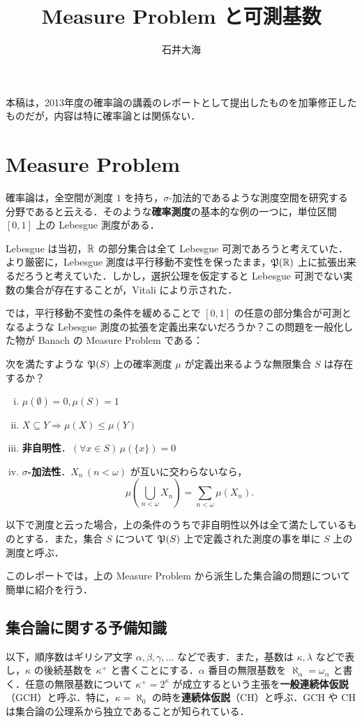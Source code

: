 \documentclass[a4j]{jsarticle}
\title{Measure Problem と可測基数}
\author{石井大海}
\begin{document}
\maketitle

本稿は，2013年度の確率論の講義のレポートとして提出したものを加筆修正したものだが，内容は特に確率論とは関係ない．

\section{Measure Problem}
確率論は，全空間が測度 $1$ を持ち，$\sigma$-加法的であるような測度空間を研究する分野であると云える．そのような{\bfseries 確率測度}の基本的な例の一つに，単位区間 $[0, 1]$ 上の Lebesgue 測度がある．

Lebesgue は当初，$\mathbb{R}$ の部分集合は全て Lebesgue 可測であろうと考えていた．より厳密に，Lebesgue 測度は平行移動不変性を保ったまま，$\mathfrak{P}(\mathbb{R})$ 上に拡張出来るだろうと考えていた．しかし，選択公理を仮定すると Lebesgue 可測でない実数の集合が存在することが，Vitali により示された．

では，平行移動不変性の条件を緩めることで $[0, 1]$ の任意の部分集合が可測となるような Lebesgue 測度の拡張を定義出来ないだろうか？この問題を一般化した物が Banach の Measure Problem である：

\begin{problem}
 次を満たすような $\mathfrak{P}(S)$ 上の確率測度 $\mu$ が定義出来るような無限集合 $S$ は存在するか？
 \begin{enumerate}[(i)]
  \item $\mu(\emptyset) = 0, \mu(S) = 1$
  \item $X \subseteq Y \Rightarrow \mu(X) \leq \mu(Y)$
  \item {\bfseries 非自明性}．$(\forall x \in S)\, \mu(\{x\}) = 0$
  \item {\bfseries $\sigma$-加法性}．$X_n \, (n < \omega)$ が互いに交わらないなら，
	\[
	 \mu\left(\bigcup_{n < \omega} X_n\right) = \sum_{n < \omega} \mu(X_n).
	\]
 \end{enumerate}
\end{problem}

以下で測度と云った場合，上の条件のうちで非自明性以外は全て満たしているものとする．また，集合 $S$ について $\mathfrak{P}(S)$ 上で定義された測度の事を単に $S$ 上の測度と呼ぶ．

このレポートでは，上の Measure Problem から派生した集合論の問題について簡単に紹介を行う．

\subsection{集合論に関する予備知識}
以下，順序数はギリシア文字 $\alpha, \beta, \gamma, \dots$ などで表す．また，基数は $\kappa, \lambda$ などで表し，$\kappa$ の後続基数を $\kappa^+$ と書くことにする．$\alpha$ 番目の無限基数を $\aleph_\alpha = \omega_\alpha$ と書く．任意の無限基数について $\kappa^+ = 2^\kappa$ が成立するという主張を{\bfseries 一般連続体仮説}（GCH）と呼ぶ．特に，$\kappa = \aleph_0$ の時を{\bfseries 連続体仮説}（CH）と呼ぶ．GCH や CH は集合論の公理系から独立であることが知られている．
\end{document}
